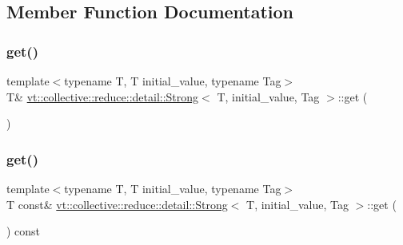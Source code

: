 \subsection{Member Function Documentation}
\mbox{\label{structvt_1_1collective_1_1reduce_1_1detail_1_1_strong_a410692a65741df1c5e3a5498f22717c6}} 
\subsubsection{\texorpdfstring{get()}{get()}\hspace{0.1cm}{\footnotesize\ttfamily [1/2]}}
{\footnotesize\ttfamily template$<$typename T, T initial\+\_\+value, typename Tag$>$ \\
T\& \hyperlink{structvt_1_1collective_1_1reduce_1_1detail_1_1_strong}{vt\+::collective\+::reduce\+::detail\+::\+Strong}$<$ T, initial\+\_\+value, Tag $>$\+::get (\begin{DoxyParamCaption}{ }\end{DoxyParamCaption})\hspace{0.3cm}{\ttfamily [inline]}}

\mbox{\label{structvt_1_1collective_1_1reduce_1_1detail_1_1_strong_a329a5157d759c1c413380b495d23c79f}} 
\subsubsection{\texorpdfstring{get()}{get()}\hspace{0.1cm}{\footnotesize\ttfamily [2/2]}}
{\footnotesize\ttfamily template$<$typename T, T initial\+\_\+value, typename Tag$>$ \\
T const\& \hyperlink{structvt_1_1collective_1_1reduce_1_1detail_1_1_strong}{vt\+::collective\+::reduce\+::detail\+::\+Strong}$<$ T, initial\+\_\+value, Tag $>$\+::get (\begin{DoxyParamCaption}{ }\end{DoxyParamCaption}) const\hspace{0.3cm}{\ttfamily [inline]}}

